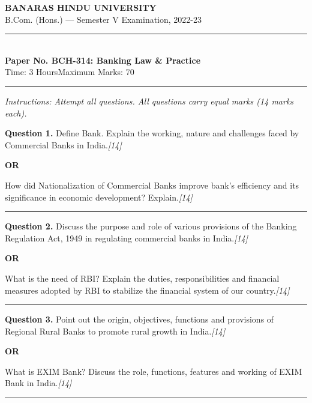 \documentclass[11pt,a4paper]{article}
\newcommand{\pts}[1]{\hfill   \textit{[#1]}}
\begin{document}
\begin{center}
  {\large\bfseries BANARAS HINDU UNIVERSITY}\\[2pt]
  {\normalsize B.Com. (Hons.) --- Semester V Examination, 2022-23}\\[6pt]
  \rule{0.8\linewidth}{0.5pt}\\[6pt]
  {\large\bfseries Paper No. BCH-314: Banking Law \& Practice}\\[4pt]
  {\normalsize Time: 3 Hours\hfill Maximum Marks: 70}
\end{center}

\rule{\linewidth}{0.4pt}

\smallskip



\noindent   \textit{Instructions: Attempt all questions. All questions carry equal marks (14 marks each).}

\bigskip




\noindent   \textbf{Question 1.}
Define Bank. Explain the working, nature and challenges faced by Commercial Banks in India.\pts{14}

\centerline{   \textbf{OR}}

How did Nationalization of Commercial Banks improve bank's efficiency and its significance in economic development? Explain.\pts{14}

\medskip\rule{\linewidth}{0.2pt}




\noindent   \textbf{Question 2.}
Discuss the purpose and role of various provisions of the Banking Regulation Act, 1949 in regulating commercial banks in India.\pts{14}

\centerline{   \textbf{OR}}

What is the need of RBI? Explain the duties, responsibilities and financial measures adopted by RBI to stabilize the financial system of our country.\pts{14}

\medskip\rule{\linewidth}{0.2pt}




\noindent   \textbf{Question 3.}
Point out the origin, objectives, functions and provisions of Regional Rural Banks to promote rural growth in India.\pts{14}

\centerline{   \textbf{OR}}

What is EXIM Bank? Discuss the role, functions, features and working of EXIM Bank in India.\pts{14}

\medskip\rule{\linewidth}{0.2pt}
\end{document}
